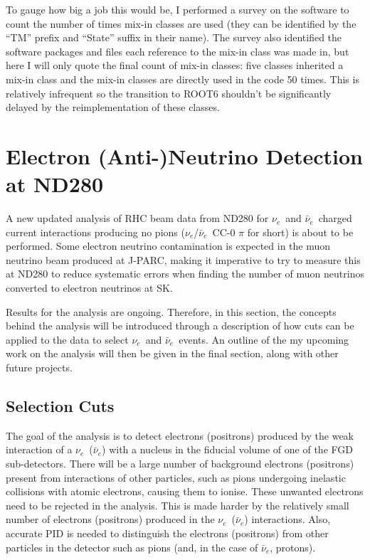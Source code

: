 \documentclass[aps,pra,12pt,notitlepage,tightenlines]{revtex4-1}
\newcommand{\nue}{$\nu_e$}
\newcommand{\anue}{$\bar\nu_e$}
\begin{document}
To gauge how big a job this would be, I performed a survey on the software to count the number of times mix-in classes are used (they can be identified by the ``TM'' prefix and ``State'' suffix in their name). The survey also identified the software packages and files each reference to the mix-in class was made in, but here I will only quote the final count of mix-in classes: five classes inherited a mix-in class and the mix-in classes are directly used in the code 50 times. This is relatively infrequent so the transition to ROOT6 shouldn't be significantly delayed by the reimplementation of these classes.

\section{Electron (Anti-)Neutrino Detection at ND280}
A new updated analysis of RHC beam data from ND280 for \nue \ and \anue \ charged current interactions producing no pions (\nue/\anue \ CC-0 $\pi$ for short) is about to be performed. Some electron neutrino contamination is expected in the muon neutrino beam produced at J-PARC, making it imperative to try to measure this at ND280 to reduce systematic errors when finding the number of muon neutrinos converted to electron neutrinos at SK.

Results for the analysis are ongoing. Therefore, in this section, the concepts behind the analysis will be introduced through a description of how cuts can be applied to the data to select \nue \ and \anue \ events. An outline of the my upcoming work on the analysis will then be given in the final section, along with other future projects.

\subsection{Selection Cuts}
The goal of the analysis is to detect electrons (positrons) produced by the weak interaction of a \nue \ (\anue) with a nucleus in the fiducial volume of one of the FGD sub-detectors. There will be a large number of background electrons (positrons) present from interactions of other particles, such as pions undergoing inelastic collisions with atomic electrons, causing them to ionise. These unwanted electrons need to be rejected in the analysis. This is made harder by the relatively small number of electrons (positrons) produced in the \nue \ (\anue) interactions. Also, accurate PID is needed to distinguish the electrons (positrons) from other particles in the detector such as pions (and, in the case of \anue , protons).
\end{document}
